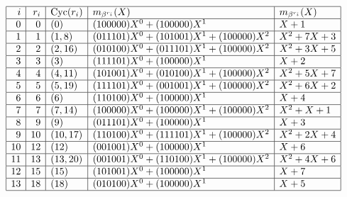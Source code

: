 \begin{mdframed}[style=MyFrame]
{\renewcommand{\arraystretch}{1.5}
$$
\begin{array}{|r|r|l|l|l|}
\hline
i & r_i & {\rm Cyc}(r_i) & m_{\beta^{r_i}}(X) & m_{\beta^{r_i}}(X) \\
\hline
0 & 0 & ( 0 ) & (100000)  X^{0} + (100000)  X^{1} & X + 1\\
\hline
1 & 1 & ( 1, 8 ) & (011101)  X^{0} + (101001)  X^{1} + (100000)  X^{2} & X^{2} + 7X + 3\\
\hline
2 & 2 & ( 2, 16 ) & (010100)  X^{0} + (011101)  X^{1} + (100000)  X^{2} & X^{2} + 3X + 5\\
\hline
3 & 3 & ( 3 ) & (111101)  X^{0} + (100000)  X^{1} & X + 2\\
\hline
4 & 4 & ( 4, 11 ) & (101001)  X^{0} + (010100)  X^{1} + (100000)  X^{2} & X^{2} + 5X + 7\\
\hline
5 & 5 & ( 5, 19 ) & (111101)  X^{0} + (001001)  X^{1} + (100000)  X^{2} & X^{2} + 6X + 2\\
\hline
6 & 6 & ( 6 ) & (110100)  X^{0} + (100000)  X^{1} & X + 4\\
\hline
7 & 7 & ( 7, 14 ) & (100000)  X^{0} + (100000)  X^{1} + (100000)  X^{2} & X^{2} + X + 1\\
\hline
8 & 9 & ( 9 ) & (011101)  X^{0} + (100000)  X^{1} & X + 3\\
\hline
9 & 10 & ( 10, 17 ) & (110100)  X^{0} + (111101)  X^{1} + (100000)  X^{2} & X^{2} + 2X + 4\\
\hline
10 & 12 & ( 12 ) & (001001)  X^{0} + (100000)  X^{1} & X + 6\\
\hline
11 & 13 & ( 13, 20 ) & (001001)  X^{0} + (110100)  X^{1} + (100000)  X^{2} & X^{2} + 4X + 6\\
\hline
12 & 15 & ( 15 ) & (101001)  X^{0} + (100000)  X^{1} & X + 7\\
\hline
13 & 18 & ( 18 ) & (010100)  X^{0} + (100000)  X^{1} & X + 5\\
\hline
\end{array}
$$}
\end{mdframed}


\bigskip

